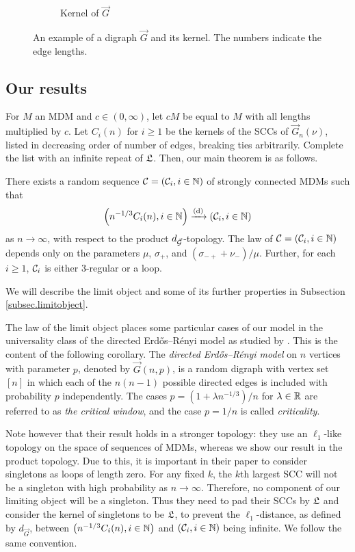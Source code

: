 \begin{figure}[htbp]
\begin{subfigure}[htbp]{0.45\textwidth}
        \caption{Kernel of $\vec{G}$}
    \end{subfigure}
    \caption{An example of a digraph $\vec{G}$ and its kernel. The numbers indicate the edge lengths.}
    \label{fig:kernel}
\end{figure}



\subsection{Our results}

For $M$ an MDM and $c\in (0,\infty)$, let $cM$ be equal to $M$ with all lengths multiplied by $c$. Let $C_i(n)$ for $i\geq 1$ be the kernels of the SCCs of $\vec{G}_n(\nu)$, listed in decreasing order of number of edges, breaking ties arbitrarily. Complete the list with an infinite repeat of $\mathfrak L$. Then, our main theorem is as follows.
\begin{theorem}\label{thm.main}
There exists a random sequence ${\mathcal C}=({\mathcal C}_i,i\in {\mathbb N})$ of strongly connected MDMs such that 
$$\left(n^{-1/3}C_i(n),i\in {\mathbb N}\right)\xrightarrow[]{\mathrm{(d)}}\left({\mathcal C}_i,i\in {\mathbb N}\right)$$
as $n\to \infty$, with respect to the product $d_{\vec{{\mathcal G}}}$-topology. The law of ${\mathcal C}=({\mathcal C}_i,i\in {\mathbb N})$ depends only on the parameters $\mu$, $\sigma_+$, and $(\sigma_{-+}+\nu_-)/\mu$. Further, for each $i\geq 1$, ${\mathcal C}_i$ is either $3$-regular or a loop.
\end{theorem}
We will describe the limit object and some of its further properties in Subsection \ref{subsec.limitobject}.

The law of the limit object places some particular cases of our model in the universality class of the directed Erd\H{o}s--Rényi model as studied by \citet{goldschmidtScalingLimitCritical2021}. This is the content of the following corollary. The \emph{directed Erd\H{o}s--Rényi model} on $n$ vertices with parameter $p$, denoted by $\vec{G}(n,p)$, is a random digraph with vertex set $[n]$ in which each of the $n(n-1)$ possible directed edges is included with probability $p$ independently. The cases $p=(1+\lambda n^{-1/3})/n$ for $\lambda\in{\mathbb R}$ are referred to as \emph{the critical window}, and the case $p=1/n$ is called \emph{criticality}.

Note however that their result holds in a stronger topology: they use an $\ell_1$-like topology on the space of sequences of MDMs, whereas we show our result in the product topology. Due to this, it is important in their paper to consider singletons as loops of length zero. For any fixed $k$, the $k$th largest SCC will not be a singleton with high probability as $n \to \infty$. Therefore, no component of our limiting object will be a singleton. Thus they need to pad their SCCs by $\mathfrak L$ and consider the kernel of singletons to be $\mathfrak L$, to prevent the $\ell_1$-distance, as defined by $d_{\vec{G}}$, between $\left(n^{-1/3}C_i(n),i\in {\mathbb N}\right)$ and $\left({\mathcal C}_i,i\in {\mathbb N}\right)$ being infinite. We follow the same convention.

